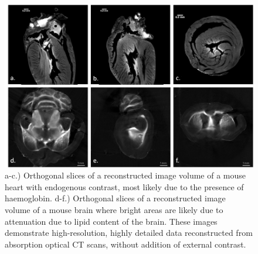 	\begin{figure}[H]
		\centering
		\includegraphics[width = \textwidth]{meth_img/heart_brain_sclbr.png}
		\caption{a-c.) Orthogonal slices of a reconstructed image volume of a mouse heart with endogenous contrast, most likely due to the presence of haemoglobin. d-f.) Orthogonal slices of a reconstructed image volume of a mouse brain where bright areas are likely due to attenuation due to lipid content of the brain. These images demonstrate high-resolution, highly detailed data reconstructed from absorption optical CT scans,  without addition of external contrast.}
		\label{fig:heart_brain}
	\end{figure}
	
